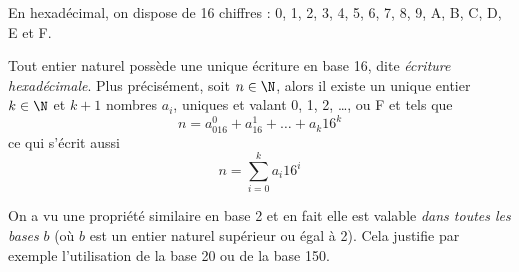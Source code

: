 En hexadécimal, on dispose de 16 chiffres : 0, 1, 2, 3, 4, 5, 6, 7, 8, 9, A, B, C, D, E et F.

\begin{propriete}
    Tout entier naturel possède une unique écriture en base 16, dite \textit{écriture hexadécimale}.
    Plus précisément, soit $n\in\N$, alors il existe un unique entier $k\in\N$ et $k+1$ nombres $a_i$, uniques et valant 0, 1, 2, \ldots, ou F et tels
    que $$n=a_016^0+a_16^1+\ldots+a_k16^k$$
    ce qui s'écrit aussi
    $$n=\sum_{i=0}^ka_i16^i$$
\end{propriete}

\begin{remarque}
    On a vu une propriété similaire en base 2 et en fait elle est valable \textit{dans toutes les bases}  $b$ (où $b$ est un entier naturel supérieur ou
    égal à 2). Cela justifie par exemple l'utilisation de la base 20 ou de la base 150.
\end{remarque}

